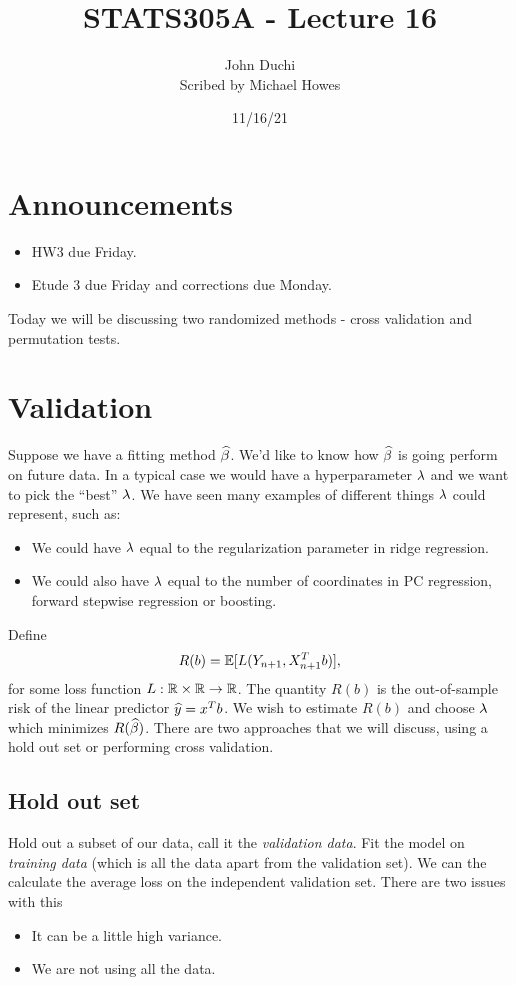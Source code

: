 




\title{STATS305A - Lecture 16}
\author{John Duchi\\ Scribed by Michael Howes}
\date{11/16/21}

\pagestyle{fancy}
\fancyhf{}


\maketitle
\tableofcontents
\section{Announcements}
\begin{itemize}
    \item HW3 due Friday.
    \item Etude 3 due Friday and corrections due Monday.
\end{itemize}
Today we will be discussing two randomized methods - cross validation and permutation tests.

\section{Validation}
Suppose we have a fitting method $\widehat{\beta}$. We'd like to know how $\widehat{\beta}$ is going perform on future data. In a typical case we would have a hyperparameter $\lambda$ and we want to pick the ``best'' $\lambda$. We have seen many examples of different things $\lambda$ could represent, such as:

\begin{itemize}
    \item We could have $\lambda$ equal to the regularization parameter in ridge regression.
    \item We could also have $\lambda$ equal to the number of coordinates in PC regression, forward stepwise regression or boosting.
\end{itemize}
Define 
\[R(b) = {\mathbb{E}}[L(Y_{n+1}, X_{n+1}^Tb)],\]
for some loss function $L : {\mathbb R} \times {\mathbb R} \to {\mathbb R}$. The quantity $R(b)$ is the out-of-sample risk of the linear predictor $\widehat{y}= x^Tb$. We wish to estimate $R(b)$ and choose $\lambda$ which minimizes $R(\widehat{\beta})$. There are two approaches that we will discuss, using a hold out set or performing cross validation.
\subsection{Hold out set}
Hold out a subset of our data, call it the \emph{validation data}. Fit the model on \emph{training data} (which is all the data apart from the validation set). We can the calculate the average loss on the independent validation set. There are two issues with this
\begin{itemize}
    \item It can be a little high variance.
    \item We are not using all the data.
\end{itemize}

